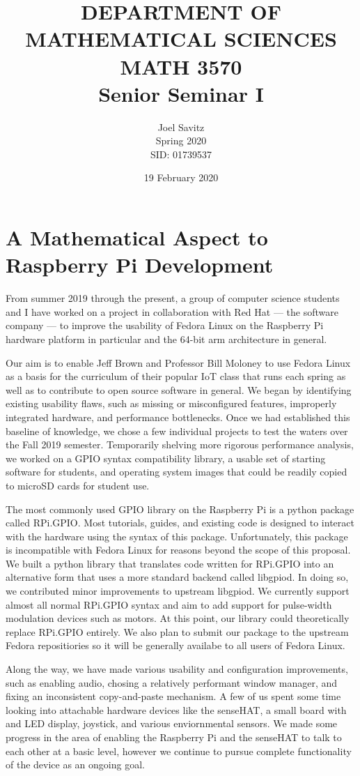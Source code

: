 \documentclass[12pt]{amsart}
\date{19 February 2020}
\title{DEPARTMENT OF MATHEMATICAL SCIENCES \protect\\
MATH 3570 \protect\\
Senior Seminar I}
\author{Joel Savitz \\ Spring 2020 \\ SID: 01739537}
\begin{document}
\maketitle

\section*{A Mathematical Aspect to Raspberry Pi Development}

From summer 2019 through the present, a group of computer science students and I have worked on a project in collaboration with Red Hat --- the software company --- to improve the usability of Fedora Linux on the Raspberry Pi hardware platform in particular and the 64-bit arm architecture in general.

Our aim is to enable Jeff Brown and Professor Bill Moloney to use Fedora Linux as a basis for the curriculum of their popular IoT class that runs each spring as well as to contribute to open source software in general.
We began by identifying existing usability flaws, such as missing or misconfigured features, improperly integrated hardware, and performance bottlenecks. Once we had established this baseline of knowledge, we chose a few individual projects to test the waters over the Fall 2019 semester. Temporarily shelving more rigorous performance analysis, we worked on a GPIO syntax compatibility library, a usable set of starting software for students, and operating system images that could be readily copied to microSD cards for student use.

The most commonly used GPIO library on the Raspberry Pi is a python package called RPi.GPIO. Most tutorials, guides, and existing code is designed to interact with the hardware using the syntax of this package. Unfortunately, this package is incompatible with Fedora Linux for reasons beyond the scope of this proposal. We built a python library that translates code written for RPi.GPIO into an alternative form that uses a more standard backend called libgpiod. In doing so, we contributed minor improvements to upstream libgpiod. We currently support almost all normal RPi.GPIO syntax and aim to add support for pulse-width modulation devices such as motors. At this point, our library could theoretically replace RPi.GPIO entirely. We also plan to submit our package to the upstream Fedora repositiories so it will be generally availabe to all users of Fedora Linux.

Along the way, we have made various usability and configuration improvements, such as enabling audio, chosing a relatively performant window manager, and fixing an inconsistent copy-and-paste mechanism. A few of us spent some time looking into attachable hardware devices like the senseHAT, a small board with and LED display, joystick, and various enviornmental sensors. We made some progress in the area of enabling the Raspberry Pi and the senseHAT to talk to each other at a basic level, however we continue to pursue complete functionality of the device as an ongoing goal.
\end{document}
